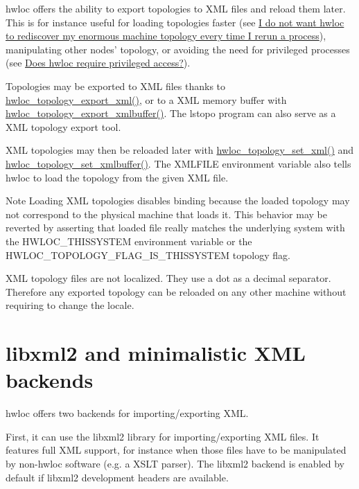hwloc offers the ability to export topologies to XML files and reload them later. This is for instance useful for loading topologies faster (see \hyperlink{a00011_faq_xml}{I do not want hwloc to rediscover my enormous machine topology every time I rerun a process}), manipulating other nodes' topology, or avoiding the need for privileged processes (see \hyperlink{a00011_faq_privileged}{Does hwloc require privileged access?}).

Topologies may be exported to XML files thanks to \hyperlink{a00045_ga45578d725c66865cfef31d0585dcff70}{hwloc\_\-topology\_\-export\_\-xml()}, or to a XML memory buffer with \hyperlink{a00045_ga739330e9402425315e44e5012631fb91}{hwloc\_\-topology\_\-export\_\-xmlbuffer()}. The lstopo program can also serve as a XML topology export tool.

XML topologies may then be reloaded later with \hyperlink{a00044_ga93efcc8a962afe1ed23393700682173f}{hwloc\_\-topology\_\-set\_\-xml()} and \hyperlink{a00044_gae7e4bade144652a2b48f5eaf0309b4ec}{hwloc\_\-topology\_\-set\_\-xmlbuffer()}. The XMLFILE environment variable also tells hwloc to load the topology from the given XML file.

\begin{DoxyNote}{Note}
Loading XML topologies disables binding because the loaded topology may not correspond to the physical machine that loads it. This behavior may be reverted by asserting that loaded file really matches the underlying system with the HWLOC\_\-THISSYSTEM environment variable or the HWLOC\_\-TOPOLOGY\_\-FLAG\_\-IS\_\-THISSYSTEM topology flag.

XML topology files are not localized. They use a dot as a decimal separator. Therefore any exported topology can be reloaded on any other machine without requiring to change the locale.
\end{DoxyNote}
\hypertarget{a00007_xml_backends}{}\section{libxml2 and minimalistic XML backends}\label{a00007_xml_backends}
hwloc offers two backends for importing/exporting XML.

First, it can use the libxml2 library for importing/exporting XML files. It features full XML support, for instance when those files have to be manipulated by non-\/hwloc software (e.g. a XSLT parser). The libxml2 backend is enabled by default if libxml2 development headers are available.

